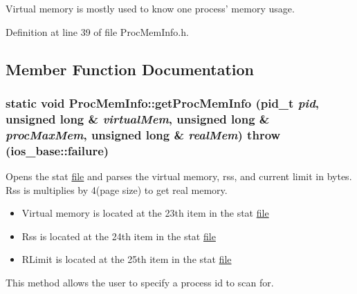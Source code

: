 Virtual memory is mostly used to know one process' memory usage. 

Definition at line 39 of file ProcMemInfo.h.

\subsection{Member Function Documentation}
\hypertarget{classProcMemInfo_e01508a66775485f385fbbba66241353}{
\subsubsection[{getProcMemInfo}]{\setlength{\rightskip}{0pt plus 5cm}static void ProcMemInfo::getProcMemInfo (pid\_\-t {\em pid}, \/  unsigned long \& {\em virtualMem}, \/  unsigned long \& {\em procMaxMem}, \/  unsigned long \& {\em realMem})  throw (ios\_\-base::failure)}}
\label{classProcMemInfo_e01508a66775485f385fbbba66241353}


Opens the stat \hyperlink{classfile}{file} and parses the virtual memory, rss, and current limit in bytes. Rss is multiplies by 4(page size) to get real memory.\begin{itemize}
\item Virtual memory is located at the 23th item in the stat \hyperlink{classfile}{file}\item Rss is located at the 24th item in the stat \hyperlink{classfile}{file}\item RLimit is located at the 25th item in the stat \hyperlink{classfile}{file}\end{itemize}


This method allows the user to specify a process id to scan for.

